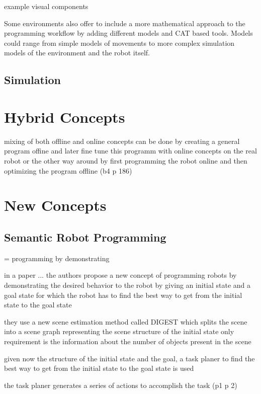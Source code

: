 \documentclass[conference]{IEEEtran}
\begin{document}
        example visual components

        Some environments also offer to include a more mathematical approach to the programming workflow by adding different models and CAT based tools.
        Models could range from simple models of movements to more complex simulation models of the environment and the robot itself. %
        

    \subsection{Simulation}

\section{Hybrid Concepts}

    mixing of both offline and online concepts
    can be done by creating a general program offine and later  fine tune this programm with online concepts on the real robot
    or the other way around by first programming the robot online and then optimizing the program offline
    (b4 p 186)

\section{New Concepts} %

    \subsection{Semantic Robot Programming}

        = programming by demonstrating

        in a paper ... the authors propose a new concept of programming robots by demonstrating the desired behavior to the robot by giving an initial state and a goal state for which the robot has to find the best way to get from the initial state to the goal state

        they use a new scene estimation method called DIGEST which splits the scene into a scene graph representing the scene structure of the initial state
        only requirement is the information about the number of objects present in the scene

        given now the structure of the initial state and the goal, a task planer to find the best way to get from the initial state to the goal state is used

        the task planer generates a series of actions to accomplish the task
        (p1 p 2)
\end{document}

